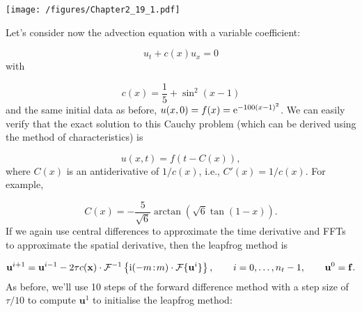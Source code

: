 \documentclass[12pt,a4paper]{article}
\begin{document}
\texttt{[image: /figures/Chapter2\_19\_1.pdf]}

Let's consider now the advection equation with a variable coefficient:

\[
u_t + c(x)u_x = 0
\]
with 

\[
c(x) = \frac{1}{5} + \sin^2(x-1)
\]
and the same initial data as before, $u(x,0) = f(x) = {\rm e}^{-100(x-1)^2}$.  We can easily verify that the exact solution to this Cauchy problem (which can be derived using the method of characteristics) is 

\[
u(x,t) = f\left(t - C(x)  \right),
\]
where $C(x)$ is an antiderivative of $1/c(x)$, i.e., $C'(x) = 1/c(x)$.    For example,

\[
C(x) = -\frac{5}{\sqrt{6}}\arctan \left(\sqrt{6}\tan(1-x)  \right).
\]
If we again use central differences to approximate the time derivative and FFTs to approximate the spatial derivative, then the leapfrog method is

\[
\mathbf{u}^{i+1} = \mathbf{u}^{i-1} - 2\tau c(\mathbf{x})\cdot \mathcal{F}^{-1}\left\lbrace {\rm i}(-m\!:\!m)\cdot\mathcal{F}\lbrace \mathbf{u}^{i} \rbrace\right\rbrace, \qquad i = 0, \ldots, n_t-1, \qquad \mathbf{u}^0 = \mathbf{f}.
\]
As before, we'll use 10 steps of the forward difference method with a step size of $\tau/10$ to compute $\mathbf{u}^{1}$ to initialise the leapfrog method:
\end{document}
